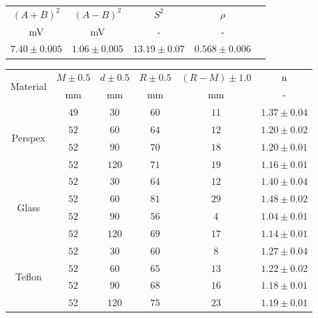 \documentclass[12pt]{article}
\begin{document}
\begin{center}
    \begin{tabular}{|c|c|c|c|c|}
    \hline
    $(A+B)^2$ & $(A-B)^2$ & $S^2$ & $\rho$ \\
    mV & mV & - & - \\
    \hline 
    $7.40\pm0.005$& $1.06\pm0.005$ & $13.19\pm0.07$ & $0.568\pm0.006$ \\
    \hline
    \end{tabular}
    \label{tab:3}
\end{center}

\newpage

\begin{center}
    \begin{tabular}{|c|c|c|c|c|c|}
    \hline
    \multirow{2}{*}{Material} & $M\pm0.5$ & $d\pm0.5$ & $R\pm0.5$ & $(R-M)\pm1.0$ & n \\
                              & mm & mm & mm & mm & - \\
    \hline  
    \multirow{4}{*}{Perspex}& $49$	& $30$	& $60$	& $11$	& $1.37\pm0.04$ \\
        	                & $52$	& $60$	& $64$	& $12$	& $1.20\pm0.02$ \\
        	                & $52$	& $90$	& $70$	& $18$	& $1.20\pm0.01$ \\
        	                & $52$	& $120$	& $71$	& $19$	& $1.16\pm0.01$ \\
    \hline
    \multirow{4}{*}{Glass}	& $52$	& $30$	& $64$	& $12$	& $1.40\pm0.04$ \\
        	                & $52$	& $60$	& $81$	& $29$	& $1.48\pm0.02$ \\
        	                & $52$	& $90$	& $56$	& $4$	& $1.04\pm0.01$ \\
        	                & $52$	& $120$	& $69$	& $17$	& $1.14\pm0.01$ \\
    \hline
    \multirow{4}{*}{Teflon}	& $52$	& $30$	& $60$	& $8$	& $1.27\pm0.04$ \\
                        	& $52$	& $60$	& $65$	& $13$	& $1.22\pm0.02$ \\
                        	& $52$	& $90$	& $68$	& $16$	& $1.18\pm0.01$ \\
                        	& $52$	& $120$	& $75$	& $23$	& $1.19\pm0.01$ \\
    \hline
    \end{tabular}
    \label{tab:4}
\end{center}
\end{document}
